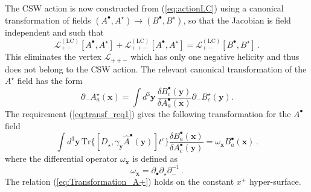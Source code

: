 \documentclass[english,american]{article}
\begin{document}
The CSW action is now constructed from (\ref{eq:actionLC}) using
a canonical transformation of fields $\left(A^{\bullet},A^{\star}\right)\rightarrow\left(B^{\bullet},B^{\star}\right)$,
so that the Jacobian is field independent and such that \citep{Mansfield2006}
\begin{equation}
\mathcal{L}_{+-}^{\left(\mathrm{LC}\right)}\left[A^{\bullet},A^{\star}\right]+\mathcal{L}_{++-}^{\left(\mathrm{LC}\right)}\left[A^{\bullet},A^{\star}\right]=\mathcal{L}_{+-}^{\left(\mathrm{LC}\right)}\left[B^{\bullet},B^{\star}\right]\,.\label{eq:transf_req1}
\end{equation}
This eliminates the vertex $\mathcal{L}_{++-}$ which has only one  negative helicity and thus does not belong to the CSW action.
 The relevant canonical transformation of the $A^{\star}$ field has
the form 
\begin{equation}
\partial_{-}A_{a}^{\star}\left(\mathbf{x}\right)=\int d^{3}\mathbf{y}\,\frac{\delta B_{c}^{\bullet}\left(\mathbf{y}\right)}{\delta A_{a}^{\bullet}\left(\mathbf{x}\right)}\partial_{-}B_{c}^{\star}\left(\mathbf{y}\right).\label{eq:Transformation_A-}
\end{equation}
 The requirement (\ref{eq:transf_req1}) gives the following transformation
for the $A^{\bullet}$ field 
\begin{equation}
\int d^{3}\mathbf{y}\,\mathrm{Tr}\Bigg\{\left[D_{\star},\gamma_{\mathbf{y}}\hat{A}^{\bullet}\left(\mathbf{y}\right)\right]t^{c}\Bigg\}\frac{\delta B_{a}^{\bullet}\left(\mathbf{x}\right)}{\delta A_{c}^{\bullet}\left(\mathbf{y}\right)}=\omega_{\mathbf{x}}B_{a}^{\bullet}\left(\mathbf{x}\right)\,.\label{eq:Transformation_A+}
\end{equation}
where the differential operator $\omega_{\mathbf{x}}$ is defined
as
\begin{equation}
\omega_{\mathbf{x}}=\partial_{\bullet}\partial_{\star}\partial_{-}^{-1}\,.\label{eq:omegaop}
\end{equation}
The relation (\ref{eq:Transformation_A+}) holds on the constant $x^{+}$
hyper-surface.
\end{document}
